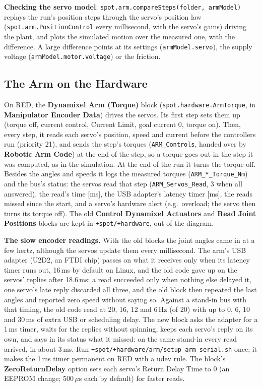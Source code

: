 \documentclass[11pt,a4paper]{article}
\newcommand{\ui}[1]{\textsf{\textbf{#1}}}
\newcommand{\pth}[1]{\texttt{#1}}
\newcommand{\fn}[1]{\texttt{#1}}
\begin{document}
\textbf{Checking the servo model}: \fn{spot.arm.compareSteps(folder, armModel)} replays the run's position steps through
the servo's position law (\fn{spot.arm.PositionControl} every millisecond, with the servo's gains) driving the plant,
and plots the simulated motion over the measured one, with the difference. A large difference points at its
settings (\fn{armModel.servo}), the supply voltage (\fn{armModel.motor.voltage}) or the friction.

\subsection{The Arm on the Hardware}\label{sec:armhw}
On RED, the \ui{Dynamixel Arm (Torque)} block (\fn{spot.hardware.ArmTorque}, in \ui{Manipulator Encoder Data}) drives
the servos. Its first step sets them up (torque off, current control, Current Limit, goal current 0, torque on). Then,
every step, it reads each servo's position, speed and current before the controllers run (priority 21), and sends the
step's torques (\fn{ARM\_Controls}, handed over by \ui{Robotic Arm Code}) at the end of the step, so a torque goes out in
the step it was computed, as in the simulation. At the end of the run it turns the torque off. Besides the angles and
speeds it logs the measured torques (\fn{ARM\_*\_Torque\_Nm}) and the bus's status: the servos read that step
(\fn{ARM\_Servos\_Read}, 3 when all answered), the read's time [ms], the USB adapter's latency timer [ms], the reads
missed since the start, and a servo's hardware alert (e.g.\ overload; the servo then turns its torque off). The old
\ui{Control Dynamixel Actuators} and \ui{Read Joint Positions} blocks are kept in \pth{+spot/+hardware}, out of the
diagram.

\textbf{The slow encoder readings.} With the old blocks the joint angles came in at a few hertz, although the servos
update them every millisecond. The arm's USB adapter (U2D2, an FTDI chip) passes on what it receives only when its
latency timer runs out, 16\,ms by default on Linux, and the old code gave up on the servos' replies after 18.6\,ms: a
read succeeded only when nothing else delayed it, one servo's late reply discarded all three, and the old block then
repeated the last angles and reported zero speed without saying so. Against a stand-in bus with that timing, the old
code read at 20, 16, 12 and 6\,Hz (of 20) with up to 0, 6, 10 and 30\,ms of extra USB or scheduling delay. The new block
asks the adapter for a 1\,ms timer, waits for the replies without spinning, keeps each servo's reply on its own, and
says in its status what it missed: on the same stand-in every read arrived, in about 3\,ms. Run
\pth{+spot/+hardware/arm/setup\_arm\_serial.sh} once; it makes the 1\,ms timer permanent on RED with a udev rule.
The block's \ui{ZeroReturnDelay} option sets each servo's Return Delay Time to 0 (an EEPROM change; 500\,$\mu$s each by
default) for faster reads.
\end{document}
